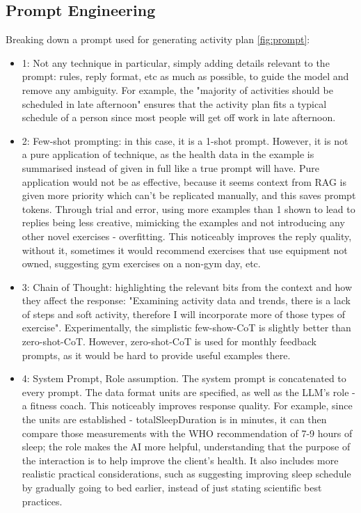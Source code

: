 \subsection{Prompt Engineering}
Breaking down a prompt used for generating activity plan \ref{fig:prompt}:
\begin{itemize}
    \item 1: Not any technique in particular, simply adding details relevant to the prompt: rules, reply format, etc as much as possible, to guide the model and remove any ambiguity. For example, the "majority of activities should be scheduled in late afternoon" ensures that the activity plan fits a typical schedule of a person since most people will get off work in late afternoon.
    \item 2: Few-shot prompting: in this case, it is a 1-shot prompt. However, it is not a pure application of technique, as the health data in the example is summarised instead of given in full like a true prompt will have. Pure application would not be as effective, because it seems context from RAG is given more priority which can't be replicated manually, and this saves prompt tokens. Through trial and error, using more examples than 1 shown to lead to replies being less creative,  mimicking the examples and not introducing any other novel exercises - overfitting. This noticeably improves the reply quality, without it, sometimes it would recommend exercises that use equipment not owned, suggesting gym exercises on a non-gym day, etc.
    \item 3: Chain of Thought: highlighting the relevant bits from the context and how they affect the response: "Examining activity data and trends, there is a lack of steps and soft activity, therefore I will incorporate more of those types of exercise". Experimentally, the simplistic few-show-CoT is slightly better than zero-shot-CoT. However, zero-shot-CoT is used for monthly feedback prompts, as it would be hard to provide useful examples there.
    \item 4: System Prompt, Role assumption. The system prompt is concatenated to every prompt. The data format units are specified, as well as the LLM's role - a fitness coach. This noticeably improves response quality. For example, since the units are established - totalSleepDuration is in minutes, it can then compare those measurements with the WHO recommendation of 7-9 hours of sleep; the role makes the AI more helpful, understanding that the purpose of the interaction is to help improve the client's health. It also includes more realistic practical considerations, such as suggesting improving sleep schedule by gradually going to bed earlier, instead of just stating scientific best practices.
\end{itemize}